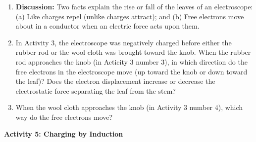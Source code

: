 \begin{enumerate}
\item \textbf{Discussion:} Two facts explain the rise or fall of the leaves
of an electroscope: (a) Like charges repel (unlike charges attract);
and (b) Free electrons move about in a conductor when an electric
force acts upon them.



\item In Activity 3, the electroscope was negatively charged before either
the rubber rod or the wool cloth was brought toward the knob. When the rubber 
rod approaches the knob (in Acticity 3 number 3), in which direction do the 
free electrons in the electroscope move (up toward the knob or down toward the 
leaf)? Does the electron displacement increase or decrease the electrostatic
force separating the leaf from the stem?\vspace{15mm}

\item When the wool cloth approaches the knob (in Activity 3 number 4), which 
way do the free electrons move?

\end{enumerate}

\newpage

\textbf{Activity 5: Charging by Induction}

